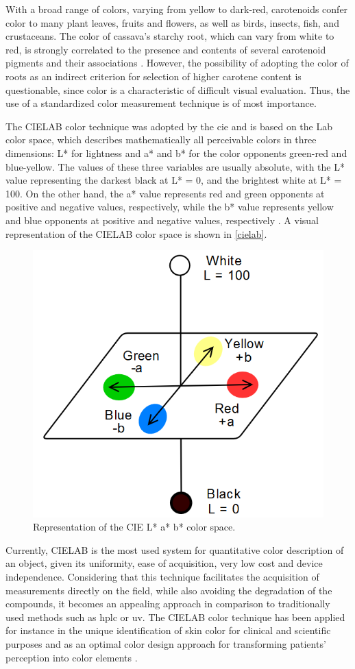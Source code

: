 With a broad range of colors, varying from yellow to dark-red, carotenoids confer color to many plant leaves, fruits and flowers, as well as birds, insects, fish, and crustaceans. The color of cassava's starchy root, which can vary from white to red, is strongly correlated to the presence and contents of several carotenoid pigments and their associations \citep{sanchez2006reduction}. However, the possibility of adopting the color of roots as an indirect criterion for selection of higher carotene content is questionable, since color is a characteristic of difficult visual evaluation. Thus, the use of a standardized color measurement technique is of most importance.

The CIELAB color technique was adopted by the \gls{cie} and is based on the Lab color space, which describes mathematically all perceivable colors in three dimensions: L* for lightness and a* and b* for the color opponents green-red and blue-yellow. The values of these three variables are usually absolute, with the L* value representing the darkest black at L* = 0, and the brightest white at L* = 100. On the other hand, the a* value represents red and green opponents at positive and negative values, respectively, while the b* value represents yellow and blue opponents at positive and negative values, respectively \citep{brockes1982evaluation, schanda2007colorimetry}. A visual representation of the CIELAB color space is shown in \autoref{cielab}.

\begin{figure}[h]
	\centering
	\includegraphics[width=0.4\linewidth]{Imagens/Case_study/cielab}
	\caption{Representation of the CIE L* a* b* color space.}
	\label{cielab}
\end{figure}

Currently, CIELAB is the most used system for quantitative color description of an object, given its uniformity, ease of acquisition, very low cost and device independence. Considering that this technique facilitates the acquisition of measurements directly on the field, while also avoiding the degradation of the compounds, it becomes an appealing approach in comparison to traditionally used methods such as \gls{hplc} or \gls{uv}. The CIELAB color technique has been applied for instance in the unique identification of skin color for clinical and scientific purposes \citep{weatherall1992skin} and as an optimal color design approach for transforming patients' perception into color elements \citep{liu2014optimal}.

